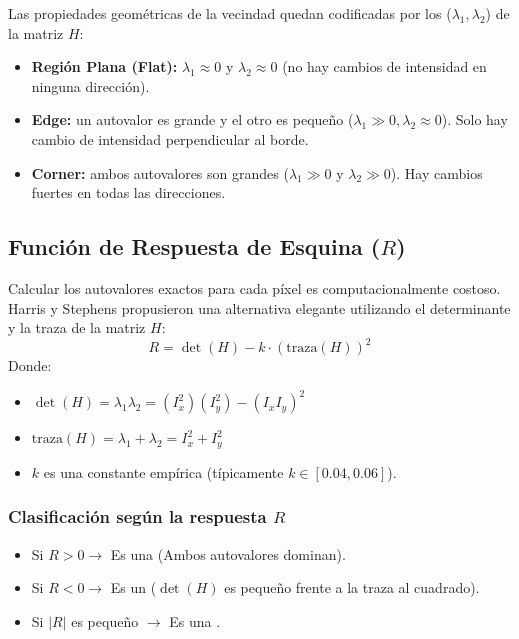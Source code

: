 \noindent
Las propiedades geométricas de la vecindad quedan codificadas por los  ($\lambda_1, \lambda_2$) de la matriz $H$:
\begin{itemize}
    \item \textbf{Región Plana (Flat):} $\lambda_1 \approx 0$ y $\lambda_2 \approx 0$ (no hay cambios de intensidad en ninguna dirección).
    \item \textbf{Edge:} un autovalor es grande y el otro es pequeño ($\lambda_1 \gg 0, \lambda_2 \approx 0$). Solo hay cambio de intensidad perpendicular al borde.
    \item \textbf{Corner:} ambos autovalores son grandes ($\lambda_1 \gg 0$ y $\lambda_2 \gg 0$). Hay cambios fuertes en todas las direcciones.
\end{itemize}

\subsection{Función de Respuesta de Esquina ($R$)}
\noindent
Calcular los autovalores exactos para cada píxel es computacionalmente costoso. Harris y Stephens propusieron una alternativa elegante utilizando el determinante y la traza de la matriz $H$:
$$R = \det(H) - k \cdot (\text{traza}(H))^2$$
Donde:
\begin{itemize}
    \item $\det(H) = \lambda_1 \lambda_2 = (I_x^2)(I_y^2) - (I_x I_y)^2$
    \item $\text{traza}(H) = \lambda_1 + \lambda_2 = I_x^2 + I_y^2$
    \item $k$ es una constante empírica (típicamente $k \in [0.04, 0.06]$).
\end{itemize}
\subsubsection{Clasificación según la respuesta $R$}
\begin{itemize}
    \item Si $R > 0 \longrightarrow$ Es una  (Ambos autovalores dominan).
    \item Si $R < 0 \longrightarrow$ Es un  ($\det(H)$ es pequeño frente a la traza al cuadrado).
    \item Si $|R|$ es pequeño $\longrightarrow$ Es una .
\end{itemize}

